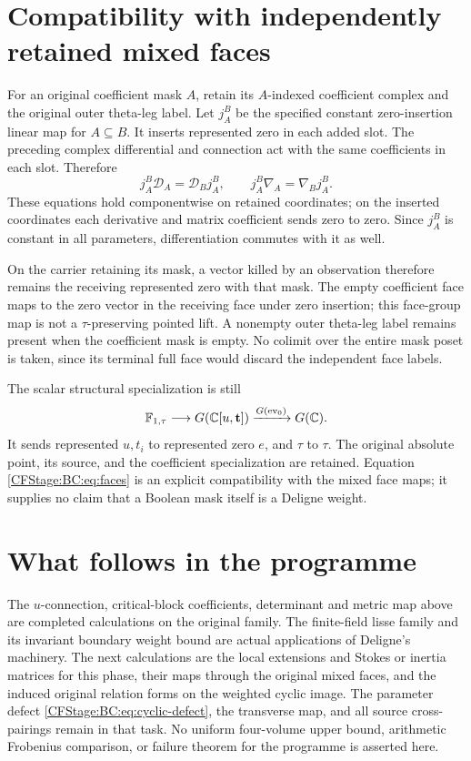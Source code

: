 \section{Compatibility with independently retained mixed faces}

For an original coefficient mask $A$, retain its $A$-indexed coefficient
complex and the original outer theta-leg label.  Let
$j_A^B$ be the specified constant zero-insertion linear map for
$A\subseteq B$.  It inserts represented zero in each added slot.
The preceding complex differential and connection act with the same
coefficients in each slot.  Therefore
\begin{equation}
 j_A^B\mathcal D_A=\mathcal D_Bj_A^B,
 \qquad j_A^B\nabla_A=\nabla_Bj_A^B.
 \label{CFStage:BC:eq:faces}
\end{equation}
These equations hold componentwise on retained coordinates; on the
inserted coordinates each derivative and matrix coefficient sends zero
to zero.  Since $j_A^B$ is constant in all parameters, differentiation
commutes with it as well.

On the carrier retaining its mask, a vector killed by an observation
therefore remains the receiving represented zero with that mask.
The empty coefficient face maps to the zero vector in the receiving
face under zero insertion; this face-group map is not a
$\tau$-preserving pointed lift.  A nonempty outer theta-leg label
remains present when the coefficient mask is empty.  No colimit over
the entire mask poset is taken, since its terminal full face would
discard the independent face labels.

The scalar structural specialization is still
\[
 \mathbb F_{1,\tau}\longrightarrow G(\mathbb C[u,\mathbf t])
       \xrightarrow{G(\operatorname{ev}_0)}G(\mathbb C).
\]
It sends represented $u,t_i$ to represented zero $e$, and $\tau$ to
$\tau$.  The original absolute point, its source, and the coefficient
specialization are retained.  Equation \eqref{CFStage:BC:eq:faces} is an explicit
compatibility with the mixed face maps; it supplies no claim that a
Boolean mask itself is a Deligne weight.

\section{What follows in the programme}

The $u$-connection, critical-block coefficients, determinant and metric
map above are completed calculations on the original family.  The
finite-field lisse family and its invariant boundary weight bound are
actual applications of Deligne's machinery.  The next calculations
are the local extensions and Stokes or inertia matrices for this phase,
their maps through the original mixed faces, and the induced original
relation forms on the weighted cyclic image.  The parameter defect
\eqref{CFStage:BC:eq:cyclic-defect}, the transverse map, and all source
cross-pairings remain in that task.  No uniform four-volume upper bound,
arithmetic Frobenius comparison, or failure theorem for the programme
is asserted here.

